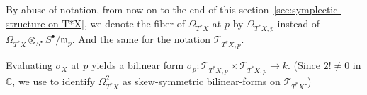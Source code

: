 \begin{remark}[\textcolor{red}{Warning}]\label{rmk:abuse-fiber-stalk}
    By abuse of notation, from now on to the end of this section~\ref{sec:symplectic-structure-on-T*X}, we denote the fiber of $\Omega_{T^{\ast}X}$ at $p$ by $\Omega_{T^{\ast}X, p}$ instead of $\Omega_{T^{\ast}X} \otimes_{S^\bullet} S^\bullet/\mathfrak{m}_p$.
    And the same for the notation $\mathcal{T}_{T^{\ast}X, p}$.
\end{remark}

Evaluating $\sigma_X$ at $p$ yields a bilinear form
$\sigma_p\colon \mathcal{T}_{T^\ast X,p}\times \mathcal{T}_{T^\ast X,p}\to k$.
(Since $2!\not=0$ in $\mathbb{C}$, we use \cite[Theorem 7.6.10]{li2019algebraic} to identify $\Omega^2_{T^\ast X}$ as skew-symmetric bilinear-forms on $\mathcal{T}_{T^\ast X}$.)

